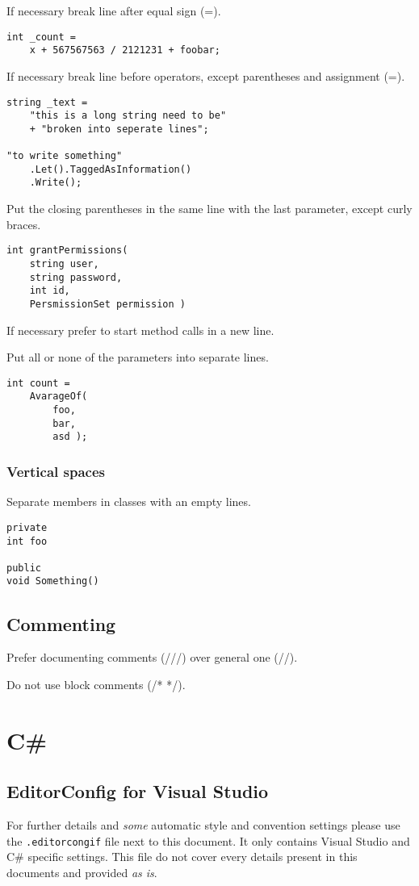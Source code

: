 \documentclass[11pt,a4paper]{book}
\begin{document}
\domark If necessary break line after equal sign (=).
\begin{verbatim}
int _count =
    x + 567567563 / 2121231 + foobar;
\end{verbatim}

\domark If necessary break line before operators, except parentheses and assignment (=).
\begin{verbatim}
string _text =
    "this is a long string need to be"
    + "broken into seperate lines";

"to write something"
    .Let().TaggedAsInformation()
    .Write();
\end{verbatim}

\domark Put the closing parentheses in the same line with the last parameter, except curly braces.
\begin{verbatim}
int grantPermissions( 
    string user,
    string password,
    int id,
    PersmissionSet permission )
\end{verbatim}

\domark If necessary prefer to start method calls in a new line.

\domark Put all or none of the parameters into separate lines.
\begin{verbatim}
int count =
    AvarageOf(
        foo,
        bar,
        asd );
\end{verbatim}

\subsection{Vertical spaces}

\domark Separate members in classes with an empty lines.
\begin{verbatim}
private
int foo

public
void Something()
\end{verbatim}

\section{Commenting}

\domark Prefer documenting comments (///) over general one (//).

\notmark Do not use block comments (/* */).

\appendix

\chapter{C\#}

\section{EditorConfig for Visual Studio}

For further details and \emph{some} automatic style and convention settings please use the \texttt{.editorcongif} file next to this document. It only contains Visual Studio and C\#{} specific settings. This file do not cover every details present in this documents and provided \emph{as is}.
\end{document}
